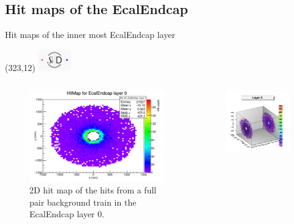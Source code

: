 \documentclass[xcolor={dvipsnames}]{beamer}
\newcommand{\sidlogo}{
  \setlength{\TPHorizModule}{1pt}
  \setlength{\TPVertModule}{1pt}
  \begin{textblock}{1}(323,12)
   \includegraphics[width=40pt,height=26pt]{figures/SiD.jpeg}
  \end{textblock}
  }
\begin{document}
\subsection{Hit maps of the EcalEndcap}
\begin{frame}{Hit maps of the inner most EcalEndcap layer}
\sidlogo
\begin{columns}[T]
\begin{column}[b]{0.5\textwidth}
 \begin{figure}
\centering
\includegraphics[height=0.5\textheight]{figures/sidloi3_pairs_1312_EcalEndcap_Hits_EcalEndcap_Hits_2D_EcalEndcap_Layer_0-eps-converted-to.pdf}
\caption{\small 2D hit map of the hits from a full pair background train in the EcalEndcap layer 0.}
\end{figure}
\end{column}
\begin{column}[b]{0.5\textwidth}
 \begin{figure}
\centering
\includegraphics[height=0.5\textheight]{figures/Hits_3D_EcalEndcap_Layer_0.png}

\end{figure}
\end{column}
\end{columns}
\end{frame}
\end{document}
